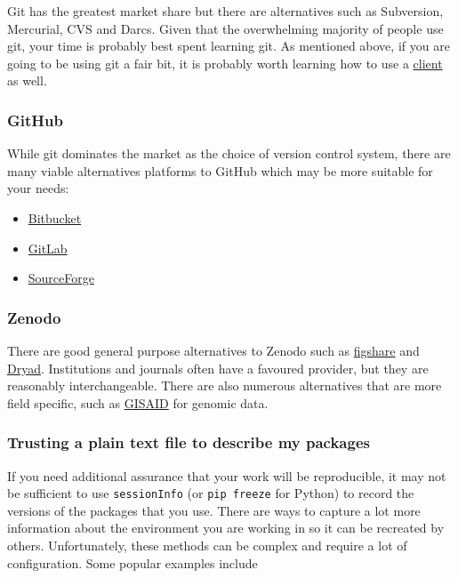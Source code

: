 \documentclass[11pt,onecolumn]{scrartcl}
\begin{document}
Git has the greatest market share but there are alternatives such as Subversion,
Mercurial, CVS and Darcs. Given that the overwhelming majority of people use
git, your time is probably best spent learning git. As mentioned above, if you
are going to be using git a fair bit, it is probably worth learning how to use a
\hyperref[sec:org199274b]{client} as well.

\subsubsection*{GitHub}
\label{sec:orgcc4fbea}

While git dominates the market as the choice of version control system, there
are many viable alternatives platforms to GitHub which may be more suitable for
your needs:

\begin{itemize}
\item \href{https://bitbucket.org/product/}{Bitbucket}
\item \href{https://about.gitlab.com/}{GitLab}
\item \href{https://sourceforge.net/}{SourceForge}
\end{itemize}

\subsubsection*{Zenodo}
\label{sec:orgb3e7706}

There are good general purpose alternatives to Zenodo such as \href{https://figshare.com/}{figshare} and
\href{http://datadryad.org/}{Dryad}. Institutions and journals often have a favoured provider, but they are
reasonably interchangeable. There are also numerous alternatives that are more
field specific, such as \href{http://www.gisaid.org/}{GISAID} for genomic data.

\subsubsection*{Trusting a plain text file to describe my packages}
\label{sec:org03b557c}

If you need additional assurance that your work will be reproducible, it may not
be sufficient to use \texttt{sessionInfo} (or \texttt{pip freeze} for Python) to record the
versions of the packages that you use. There are ways to capture a lot more
information about the environment you are working in so it can be recreated by
others. Unfortunately, these methods can be complex and require a lot of
configuration. Some popular examples include
\end{document}
